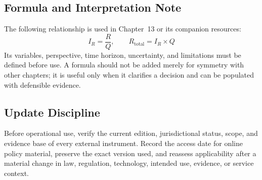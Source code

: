 \subsection{Formula and Interpretation Note}
The following relationship is used in Chapter~13 or its companion resources:
\begin{equation}
I_R=\frac{R}{Q},\qquad R_{\mathrm{total}}=I_R\times Q
\label{eq:comp-ch13-reference-formula}
\end{equation}
Its variables, perspective, time horizon, uncertainty, and limitations must be
defined before use. A formula should not be added merely for symmetry with other
chapters; it is useful only when it clarifies a decision and can be populated with
defensible evidence.

\subsection{Update Discipline}
Before operational use, verify the current edition, jurisdictional status, scope,
and evidence base of every external instrument. Record the access date for online
policy material, preserve the exact version used, and reassess applicability after a
material change in law, regulation, technology, intended use, evidence, or service
context.
